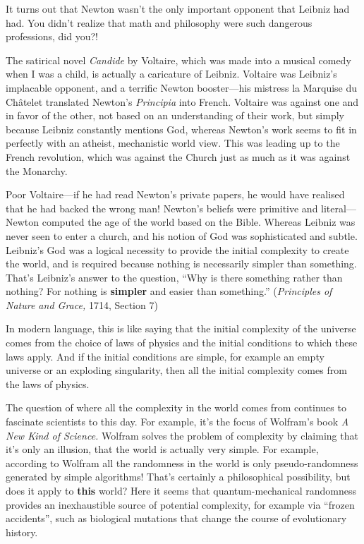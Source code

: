 \documentclass[12pt]{book}
\begin{document}
It turns out that Newton wasn't the only important opponent that Leibniz had had.
You didn't realize that math and philosophy were such dangerous professions, did you?!
 
The satirical novel \emph{Candide} by Voltaire, which was made into a musical comedy
when I was a child, is actually a caricature of Leibniz.
Voltaire was Leibniz's implacable opponent, and a terrific Newton
booster---his mistress 
la Marquise du Ch\^atelet
translated Newton's \emph{Principia} into French.
Voltaire was against one and in favor of the other, not based on an understanding of
their work, but simply because Leibniz constantly mentions God, whereas Newton's work
seems to fit in perfectly with an atheist, mechanistic world view. 
This was leading up to the French revolution, which was against the Church just as much as 
it was against the Monarchy.
 
Poor Voltaire---if he had read Newton's private papers, he would have realised that
he had backed the wrong man!  Newton's beliefs were primitive and literal---Newton
computed the age of the world based on the Bible. Whereas Leibniz was never seen
to enter a church, and his notion of God 
was sophisticated and subtle.
Leibniz's God was a logical necessity
to provide the initial complexity to create the world, and is required because
nothing is necessarily simpler than something. That's Leibniz's answer to the 
question, 
``Why is there something rather than nothing? For nothing is \textbf{simpler} 
and easier than something.''
(\emph{Principles of Nature and Grace,} 1714, Section 7)
 
In modern language, this is like saying that the initial complexity of the universe
comes from the choice of laws of physics and the initial conditions to which these laws apply.
And if the initial conditions are simple, for example an empty universe or an exploding singularity, 
then all the initial complexity comes from the laws of physics.
 
The question of where all the complexity in the world comes from continues to fascinate
scientists to this day. For example, it's the focus of Wolfram's book \emph{A New Kind of Science.}
Wolfram solves
the problem of complexity by claiming that it's only an illusion, that the world is actually
very simple. For example, according to Wolfram
all the randomness in the world is only pseudo-randomness
generated by simple algorithms!  That's certainly a philosophical possibility, but
does it apply to \textbf{this} world?  Here it seems that quantum-mechanical randomness
provides an inexhaustible source of potential complexity, 
for example via ``frozen accidents'', 
such as biological mutations that change the course of evolutionary history.
 
\end{document}
